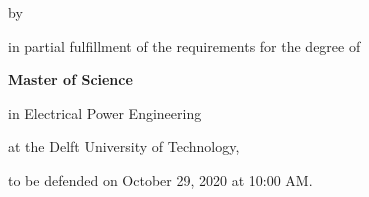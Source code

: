 \begin{titlepage}

\begin{center}


\vspace*{2\bigskipamount}

{\makeatletter
\titlestyle\color{tudelft-cyan}\Huge\@title
\makeatother}

{\makeatletter
\ifx\@subtitle\undefined\else
    \bigskip
    \titlefont\titleshape\Huge\@subtitle
\fi
\makeatother}

\bigskip
\bigskip

by

\bigskip
\bigskip

{\makeatletter
\titlefont\Huge\bfseries\@author
\makeatother}

\vfill

in partial fulfillment of the requirements for the degree of

\bigskip
\bigskip

{\bfseries Master of Science}

in Electrical Power Engineering

\bigskip
\bigskip

at the Delft University of Technology,

to be defended on October 29, 2020 at 10:00 AM.

\vspace{25mm}


\end{center}
\end{titlepage}

